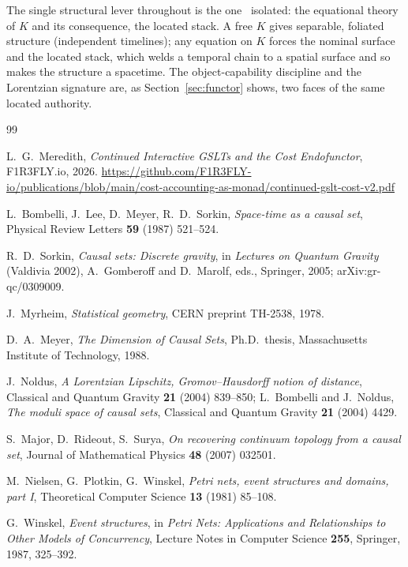 \documentclass[11pt]{article}
\theoremstyle{definition}
\theoremstyle{plain}
\theoremstyle{remark}
\begin{document}
The single structural lever throughout is the one~\cite{CostNote}
isolated: the equational theory of $K$ and its consequence, the located
stack. A free $K$ gives separable, foliated structure (independent
timelines); any equation on $K$ forces the nominal surface and the
located stack, which welds a temporal chain to a spatial surface and so
makes the structure a spacetime. The object-capability discipline and the
Lorentzian signature are, as Section~\ref{sec:functor} shows, two faces
of the same located authority.

\begin{thebibliography}{99}

L.~G.~Meredith,
\emph{Continued Interactive GSLTs and the Cost Endofunctor},
F1R3FLY.io, 2026.
\url{https://github.com/F1R3FLY-io/publications/blob/main/cost-accounting-as-monad/continued-gslt-cost-v2.pdf}

L.~Bombelli, J.~Lee, D.~Meyer, R.~D.~Sorkin,
\emph{Space-time as a causal set},
Physical Review Letters \textbf{59} (1987) 521--524.

R.~D.~Sorkin,
\emph{Causal sets: Discrete gravity},
in \textit{Lectures on Quantum Gravity} (Valdivia 2002),
A.~Gomberoff and D.~Marolf, eds., Springer, 2005;
arXiv:gr-qc/0309009.

J.~Myrheim,
\emph{Statistical geometry},
CERN preprint TH-2538, 1978.

D.~A.~Meyer,
\emph{The Dimension of Causal Sets},
Ph.D.\ thesis, Massachusetts Institute of Technology, 1988.

J.~Noldus,
\emph{A Lorentzian Lipschitz, Gromov--Hausdorff notion of distance},
Classical and Quantum Gravity \textbf{21} (2004) 839--850;
L.~Bombelli and J.~Noldus,
\emph{The moduli space of causal sets},
Classical and Quantum Gravity \textbf{21} (2004) 4429.

S.~Major, D.~Rideout, S.~Surya,
\emph{On recovering continuum topology from a causal set},
Journal of Mathematical Physics \textbf{48} (2007) 032501.

M.~Nielsen, G.~Plotkin, G.~Winskel,
\emph{Petri nets, event structures and domains, part I},
Theoretical Computer Science \textbf{13} (1981) 85--108.

G.~Winskel,
\emph{Event structures},
in \textit{Petri Nets: Applications and Relationships to Other Models of
Concurrency}, Lecture Notes in Computer Science \textbf{255},
Springer, 1987, 325--392.


\end{thebibliography}
\end{document}
